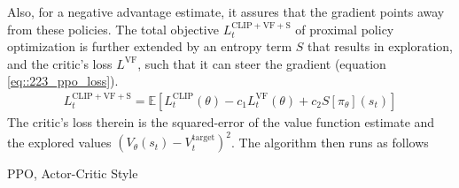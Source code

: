 Also, for a negative advantage estimate, it assures that the gradient points away from these policies. The total objective $L_t^{\text{CLIP}+\text{VF}+\text{S}}$ of proximal policy optimization is further extended by an entropy term $S$ that results in exploration, and the critic's loss $L^\text{VF}$, such that it can steer the gradient (equation \ref{eq::223_ppo_loss}).
\begin{align}
	L_t^{\text{CLIP}+\text{VF}+\text{S}} = \mathbb{E}\left[L_t^\text{CLIP}(\theta)-c_1L_t^\text{VF}(\theta)+c_2S\left[\pi_\theta\right](s_t)\right]
	\label{eq::223_ppo_loss}
\end{align}
The critic's loss therein is the squared-error of the value function estimate and the explored values $(V_\theta(s_t)-V^\text{target}_t)^2$. The algorithm then runs as follows
\begin{algorithm}
	\SetAlgoLined
	\caption{PPO, Actor-Critic Style}
	\label{alg::225_ac}
\end{algorithm}
